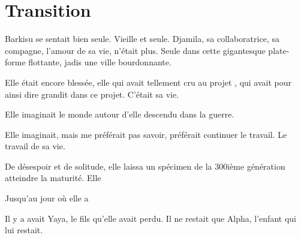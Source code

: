 \chapter{Transition}

Barkisu se sentait bien seule. Vieille et seule.
Djamila, sa collaboratrice, sa compagne, l'amour de sa vie, n'était plus.
Seule dans cette gigantesque plate-forme flottante, jadis une ville bourdonnante.

Elle était encore blessée, elle qui avait tellement cru au projet \nomProjet{},
qui avait pour ainsi dire grandit dans ce projet. C'était sa vie.

Elle imaginait le monde autour d'elle descendu dans la guerre.

Elle imaginait, mais me préférait pas savoir, préférait continuer le travail.
Le travail de sa vie. 

De désespoir et de solitude, elle laissa un spécimen de la 300ième génération atteindre la maturité.
Elle 

Jusqu'au jour où elle a 

Il y a avait Yaya, le fils qu'elle avait perdu.
Il ne restait que Alpha, l'enfant qui lui restait.



